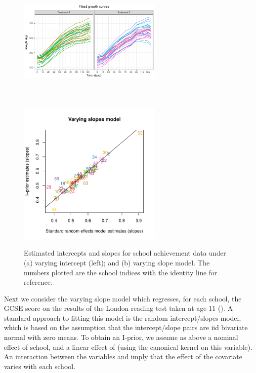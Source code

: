 \begin{knitrout}
\color{fgcolor}\begin{figure}

{\centering \includegraphics[width=7cm,height=7cm]{figure/plot-1} 
\includegraphics[width=7cm,height=7cm]{figure/plot-2} 

}

\caption[Estimated intercepts and slopes for school achievement data under (a) varying intercept (left)]{Estimated intercepts and slopes for school achievement data under (a) varying intercept (left); and (b) varying slope model. The numbers plotted are the school indices with the identity line for reference.}\label{fig:plot}
\end{figure}


\end{knitrout}

Next we consider the varying slope model which regresses, for each school, the GCSE score on the results of the London reading test taken at age 11 (). A standard approach to fitting this model is the random intercept/slopes model, which is based on the assumption that the intercept/slope pairs are iid bivariate normal with zero means. To obtain an I-prior, we assume as above a nominal effect of school, and a linear effect of  (using the canonical kernel on this variable). An interaction between the variables  and  imply that the effect of the covariate  varies with each school.

